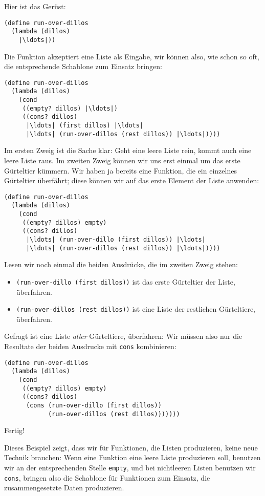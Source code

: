 Hier ist das Gerüst:
%
\begin{lstlisting}
(define run-over-dillos
  (lambda (dillos)
    |\ldots|))
\end{lstlisting}
%
Die Funktion akzeptiert eine Liste als Eingabe, wir können also, wie
schon so oft, die entsprechende Schablone zum Einsatz bringen:
%
\begin{lstlisting}
(define run-over-dillos
  (lambda (dillos)
    (cond
     ((empty? dillos) |\ldots|)
     ((cons? dillos)
      |\ldots| (first dillos) |\ldots|
      |\ldots| (run-over-dillos (rest dillos)) |\ldots|))))
\end{lstlisting}
%
Im ersten Zweig ist die Sache klar: Geht eine leere Liste rein, kommt
auch eine leere Liste raus.  Im zweiten Zweig können wir uns erst
einmal um das erste Gürteltier kümmern.  Wir haben ja bereits eine
Funktion, die ein einzelnes Gürteltier überfährt; diese können wir auf
das erste Element der Liste anwenden:
%
\begin{lstlisting}
(define run-over-dillos
  (lambda (dillos)
    (cond
     ((empty? dillos) empty)
     ((cons? dillos)
      |\ldots| (run-over-dillo (first dillos)) |\ldots|
      |\ldots| (run-over-dillos (rest dillos)) |\ldots|))))
\end{lstlisting}
%
Lesen wir noch einmal die beiden Ausdrücke, die im zweiten Zweig
stehen:
%
\begin{itemize}
\item \lstinline{(run-over-dillo (first dillos))} ist das erste Gürteltier
  der Liste, überfahren.
\item \lstinline{(run-over-dillos (rest dillos))} ist eine Liste der
  restlichen Gürteltiere, überfahren.
\end{itemize}
%
Gefragt ist eine Liste \emph{aller} Gürteltiere, überfahren:
Wir müssen also nur die Resultate der beiden Ausdrucke mit
\lstinline{cons} kombinieren:
%
\begin{lstlisting}
(define run-over-dillos
  (lambda (dillos)
    (cond
     ((empty? dillos) empty)
     ((cons? dillos)
      (cons (run-over-dillo (first dillos))
            (run-over-dillos (rest dillos)))))))
\end{lstlisting}
%
Fertig!

Dieses Beispiel zeigt, dass wir für Funktionen, die Listen produzieren,
keine neue Technik brauchen: Wenn eine Funktion eine leere Liste
produzieren soll, benutzen wir an der entsprechenden Stelle
\lstinline{empty}, und bei nichtleeren Listen benutzen wir
\lstinline{cons}, bringen also die Schablone für Funktionen zum
Einsatz, die zusammengesetzte Daten produzieren.

